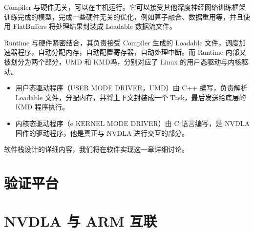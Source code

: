 Compiler 与硬件无关，可以在主机运行。它可以接受其他深度神经网络训练框架训练完成的模型，完成一些硬件无关的优化，例如算子融合、数据重用等，并且使用 FlatBuffers 将处理结果封装成 Loadable 数据流文件。

Runtime 与硬件紧密结合，其负责接受 Compiler 生成的 Loadable 文件，调度加速器程序，自动分配内存，自动配置寄存器，自动处理中断。而 Runtime 内部又被划分为两个部分，UMD 和 KMD吗，分别对应了 Linux 的用户态驱动与内核驱动。

\begin{itemize}
    \item 用户态驱动程序（USER MODE DRIVER，UMD）由 C++ 编写，负责解析 Loadable 文件，分配内存，并将上下文封装成一个 Task，最后发送给底层的 KMD 程序执行。
    \item 内核态驱动程序（e KERNEL MODE DRIVER）由 C 语言编写，是 NVDLA 固件的驱动程序，他是真正与 NVDLA 进行交互的部分。
\end{itemize}

软件栈设计的详细内容，我们将在软件实现这一章详细讨论。

\section{验证平台}

\section{NVDLA 与 ARM 互联}
